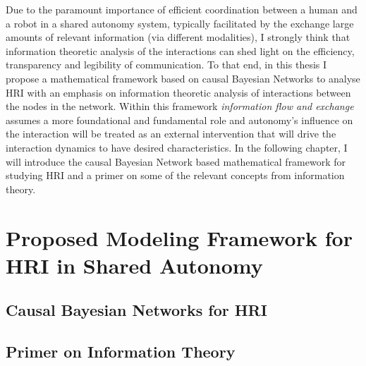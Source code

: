 \documentclass[12pt]{article}
\newcommand{\DGc}[1]{{\textbf{\color{blue}{#1}}}}
\begin{document}
Due to the paramount importance of efficient coordination between a human and a robot in a shared autonomy system, typically facilitated by the exchange large amounts of relevant information (via different modalities), I strongly think that information theoretic analysis of the interactions can shed light on the efficiency, transparency and legibility of communication. To that end, in this thesis I propose a mathematical framework based on causal Bayesian Networks to analyse HRI 
with an emphasis on information theoretic analysis of interactions between the nodes in the network. Within this framework \textit{information flow and exchange} assumes a more foundational and fundamental role and autonomy's influence on the interaction will be treated as an external intervention that will drive the interaction dynamics to have desired characteristics. In the following chapter, I will introduce the causal Bayesian Network based mathematical framework for studying HRI and a primer on some of the relevant concepts from information theory. 

% 
%
%
%

%
%
%
%

\pagebreak
\section{Proposed Modeling Framework for HRI in Shared Autonomy}
\subsection{Causal Bayesian Networks for HRI}
\subsection{Primer on Information Theory}
\end{document}
